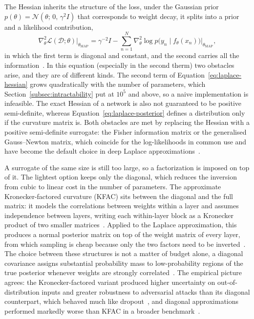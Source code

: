 The Hessian inherits the structure of the loss, under the Gaussian prior
$p(\theta) = \mathcal{N}(\theta;\, 0,\, \gamma^2 I)$ that corresponds to weight
decay, it splits into a prior and a likelihood contribution,
%
\begin{equation}
    \nabla^2_\theta \mathcal{L}(\mathcal{D}; \theta)
    \bigr|_{\theta_{\mathrm{MAP}}}
    = \gamma^{-2} I
      - \sum_{n=1}^{N}
        \nabla^2_\theta \log p\bigl(y_n \mid f_\theta(x_n)\bigr)
        \bigr|_{\theta_{\mathrm{MAP}}} ,
    \label{eq:laplace-hessian}
\end{equation}
%
in which the first term is diagonal and constant, and the second carries all the
information~\cite{daxberger2021}. In this equation (especially in the second therm) two obstacles arise, and they are of different kinds. The second term of Equation~\eqref{eq:laplace-hessian} grows quadratically with the number of parameters, which Section~\ref{subsec:intractability} put at $10^5$ and above, so a naive implementation is infeasible. The exact Hessian of a network is also not guaranteed to be positive semi-definite, whereas Equation~\eqref{eq:laplace-posterior} defines a distribution only if the curvature matrix is. Both obstacles are met by replacing the Hessian with a positive semi-definite surrogate: the Fisher information matrix or the generalised Gauss--Newton matrix, which coincide for the log-likelihoods in common use and have become the default choice in deep Laplace approximations~\cite{daxberger2021}.

A surrogate of the same size is still too large, so a factorization is imposed on
top of it. The lightest option keeps only the diagonal, which reduces the inversion from cubic to linear cost in the number of parameters. The approximate Kronecker-factored curvature (KFAC) sits between the diagonal and the full matrix: it models the correlations between weights within a layer and assumes independence between layers, writing each within-layer block as a
Kronecker product of two smaller matrices~\cite{daxberger2021}. Applied to the
Laplace approximation, this produces a normal posterior matrix on top of the weight
matrix of every layer, from which sampling is cheap because only the two factors
need to be inverted~\cite{ritter2018}. The choice between these structures is
not a matter of budget alone, a diagonal covariance assigns substantial
probability mass to low-probability regions of the true posterior whenever
weights are strongly correlated~\cite{ritter2018}. The empirical picture
agrees: the Kronecker-factored variant produced higher uncertainty on
out-of-distribution inputs and greater robustness to adversarial attacks than
its diagonal counterpart, which behaved much like dropout~\cite{ritter2018},
and diagonal approximations performed markedly worse than KFAC in a broader
benchmark~\cite{daxberger2021}.

